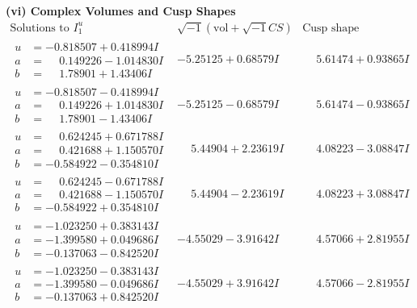 \documentclass[1p]{elsarticle_modified}
\theoremstyle{definition}
\newcommand{\I}{\sqrt{-1}}
\begin{document}
\newpage\flushleft \textbf{(vi) Complex Volumes and Cusp Shapes}
$$\begin{array}{c|c|c}  
\text{Solutions to }I^u_{1}& \I (\text{vol} + \sqrt{-1}CS) & \text{Cusp shape}\\
 \hline 
\begin{aligned}
u &= -0.818507 + 0.418994 I \\
a &= \phantom{-}0.149226 - 1.014830 I \\
b &= \phantom{-}1.78901 + 1.43406 I\end{aligned}
 & -5.25125 + 0.68579 I & \phantom{-}5.61474 + 0.93865 I \\ \hline\begin{aligned}
u &= -0.818507 - 0.418994 I \\
a &= \phantom{-}0.149226 + 1.014830 I \\
b &= \phantom{-}1.78901 - 1.43406 I\end{aligned}
 & -5.25125 - 0.68579 I & \phantom{-}5.61474 - 0.93865 I \\ \hline\begin{aligned}
u &= \phantom{-}0.624245 + 0.671788 I \\
a &= \phantom{-}0.421688 + 1.150570 I \\
b &= -0.584922 - 0.354810 I\end{aligned}
 & \phantom{-}5.44904 + 2.23619 I & \phantom{-}4.08223 - 3.08847 I \\ \hline\begin{aligned}
u &= \phantom{-}0.624245 - 0.671788 I \\
a &= \phantom{-}0.421688 - 1.150570 I \\
b &= -0.584922 + 0.354810 I\end{aligned}
 & \phantom{-}5.44904 - 2.23619 I & \phantom{-}4.08223 + 3.08847 I \\ \hline\begin{aligned}
u &= -1.023250 + 0.383143 I \\
a &= -1.399580 + 0.049686 I \\
b &= -0.137063 - 0.842520 I\end{aligned}
 & -4.55029 - 3.91642 I & \phantom{-}4.57066 + 2.81955 I \\ \hline\begin{aligned}
u &= -1.023250 - 0.383143 I \\
a &= -1.399580 - 0.049686 I \\
b &= -0.137063 + 0.842520 I\end{aligned}
 & -4.55029 + 3.91642 I & \phantom{-}4.57066 - 2.81955 I \\ \hline\begin{aligned}

\end{aligned}
\end{array}$$
\end{document}
